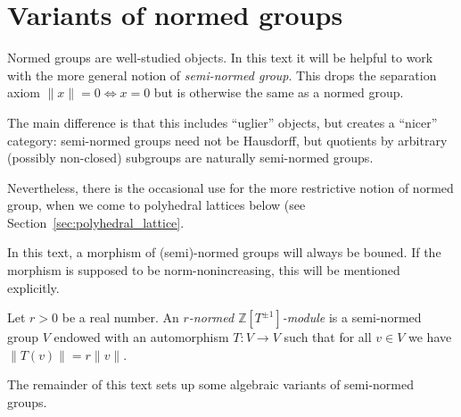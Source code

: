 \section{Variants of normed groups}
\label{sec:normed_groups}

\begin{remark}
  Normed groups are well-studied objects.
  In this text it will be helpful to work with
  the more general notion of \emph{semi-normed group}.
  This drops the separation axiom $\|x\| = 0 \iff x = 0$
  but is otherwise the same as a normed group.

  The main difference is that this includes ``uglier'' objects,
  but creates a ``nicer'' category:
  semi-normed groups need not be Hausdorff,
  but quotients by arbitrary (possibly non-closed) subgroups
  are naturally semi-normed groups.

  Nevertheless, there is the occasional use for the more restrictive
  notion of normed group, when we come to polyhedral lattices below
  (see Section~\ref{sec:polyhedral_lattice}.

  In this text, a morphism of (semi)-normed groups will always be bouned.
  If the morphism is supposed to be norm-nonincreasing,
  this will be mentioned explicitly.
\end{remark}

\begin{definition}
  \label{normed_with_aut}
  \leanok
  Let $r > 0$ be a real number.
  An \emph{$r$-normed $\mathbb Z[T^{\pm 1}]$-module}
  is a semi-normed group $V$
  endowed with an automorphism $T \colon V \to V$ such that
  for all $v \in V$ we have $\|T(v)\| = r\|v\|$.
\end{definition}

The remainder of this text sets up some algebraic variants of semi-normed groups.

